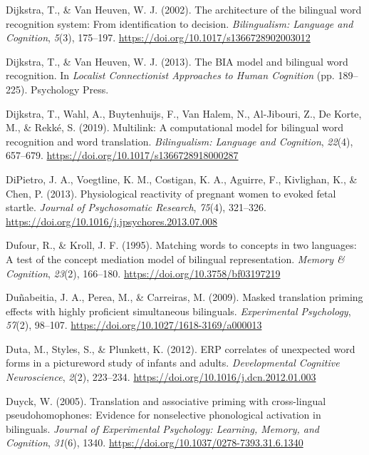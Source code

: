 \documentclass[
  12pt,
  b5paperpaper,
  twoside]{scrreprt}
\newlength{\cslhangindent}
\newlength{\cslentryspacingunit} %
\newenvironment{CSLReferences}[2] %
 {%
  \setlength{\parindent}{0pt}
  \ifodd #1
  \let\oldpar\par
  \def\par{\hangindent=\cslhangindent\oldpar}
  \fi
  \setlength{\parskip}{#2\cslentryspacingunit}
 }%
 {}
\begin{document}
\begin{CSLReferences}{1}{0}
\leavevmode{}%
Dijkstra, T., \& Van Heuven, W. J. (2002). The architecture of the
bilingual word recognition system: From identification to decision.
\emph{Bilingualism: Language and Cognition}, \emph{5}(3), 175--197.
\url{https://doi.org/10.1017/s1366728902003012}

\leavevmode{}%
Dijkstra, T., \& Van Heuven, W. J. (2013). The {BIA} model and bilingual
word recognition. In \emph{Localist {Connectionist Approaches} to {Human
Cognition}} (pp. 189--225). {Psychology Press}.

\leavevmode{}%
Dijkstra, T., Wahl, A., Buytenhuijs, F., Van Halem, N., Al-Jibouri, Z.,
De Korte, M., \& Rekké, S. (2019). Multilink: A computational model for
bilingual word recognition and word translation. \emph{Bilingualism:
Language and Cognition}, \emph{22}(4), 657--679.
\url{https://doi.org/10.1017/s1366728918000287}

\leavevmode{}%
DiPietro, J. A., Voegtline, K. M., Costigan, K. A., Aguirre, F.,
Kivlighan, K., \& Chen, P. (2013). Physiological reactivity of pregnant
women to evoked fetal startle. \emph{Journal of Psychosomatic Research},
\emph{75}(4), 321--326.
\url{https://doi.org/10.1016/j.jpsychores.2013.07.008}

\leavevmode{}%
Dufour, R., \& Kroll, J. F. (1995). Matching words to concepts in two
languages: A test of the concept mediation model of bilingual
representation. \emph{Memory \& Cognition}, \emph{23}(2), 166--180.
\url{https://doi.org/10.3758/bf03197219}

\leavevmode{}%
Duñabeitia, J. A., Perea, M., \& Carreiras, M. (2009). Masked
translation priming effects with highly proficient simultaneous
bilinguals. \emph{Experimental Psychology}, \emph{57}(2), 98--107.
\url{https://doi.org/10.1027/1618-3169/a000013}

\leavevmode{}%
Duta, M., Styles, S., \& Plunkett, K. (2012). {ERP} correlates of
unexpected word forms in a picture{\textendash}word study of infants and
adults. \emph{Developmental Cognitive Neuroscience}, \emph{2}(2),
223--234. \url{https://doi.org/10.1016/j.dcn.2012.01.003}

\leavevmode{}%
Duyck, W. (2005). Translation and associative priming with cross-lingual
pseudohomophones: Evidence for nonselective phonological activation in
bilinguals. \emph{Journal of Experimental Psychology: Learning, Memory,
and Cognition}, \emph{31}(6), 1340.
\url{https://doi.org/10.1037/0278-7393.31.6.1340}


\end{CSLReferences}
\end{document}
